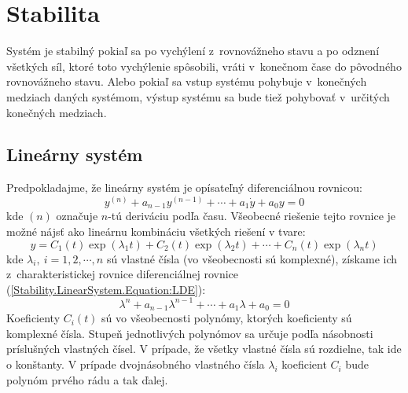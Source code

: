 \documentclass[a4paper, 10pt, ]{article}
\begin{document}
\bigskip

\normalsize
\normalfont



\section{Stabilita}

Systém je stabilný pokiaľ sa po vychýlení z~rovnovážneho stavu a po odznení všetkých síl, ktoré toto vychýlenie spôsobili, vráti v~konečnom čase do pôvodného rovnovážneho stavu. Alebo pokiaľ sa vstup systému pohybuje v~konečných medziach daných systémom, výstup systému sa bude tiež pohybovať v~určitých konečných medziach.

\subsection{Lineárny systém}
\label{Stability.LinearSystem}

Predpokladajme, že lineárny systém je opísateľný diferenciálnou rovnicou:
\begin{equation}
    \label{Stability.LinearSystem.Equation:LDE}
    y^{(n)} + a_{n - 1} y^{(n - 1)} + \cdots + a_{1} \dot{y} + a_{0} y = 0    
\end{equation}
kde $(n)$ označuje $n$-tú deriváciu podľa času. Všeobecné riešenie tejto rovnice je možné nájsť ako lineárnu kombináciu všetkých riešení v tvare:
\begin{equation}
    \label{Stability.LinearSystem.Equation:LDESolution}
    y = 
    C_{1}(t) \exp(\lambda_{1} t) + C_{2}(t) \exp(\lambda_{2} t) + \cdots + C_{n}(t) \exp(\lambda_{n} t)
\end{equation}
kde $\lambda_{i}, \ i = 1, 2, \cdots, n$ sú vlastné čísla (vo všeobecnosti sú komplexné), získame ich z~charakteristickej rovnice diferenciálnej rovnice (\ref{Stability.LinearSystem.Equation:LDE}):
\begin{equation}
    \lambda^{n} + a_{n - 1} \lambda^{n - 1} + \cdots + a_{1} \lambda + a_{0} = 0    
\end{equation} 
Koeficienty $C_i(t)$ sú vo všeobecnosti polynómy, ktorých koeficienty sú komplexné čísla. Stupeň jednotlivých polynómov sa určuje podľa násobnosti príslušných vlastných čísel. V prípade, že všetky vlastné čísla sú rozdielne, tak ide o konštanty. V prípade dvojnásobného vlastného čísla $\lambda_{i}$ koeficient $C_{i}$ bude polynóm prvého rádu a tak ďalej.
\end{document}
